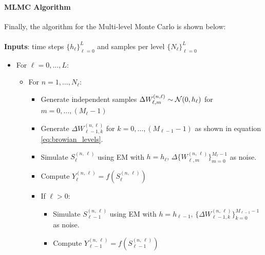 \paragraph{MLMC Algorithm}
Finally, the algorithm for the Multi-level Monte Carlo is shown below:
\\
\\
\textbf{Inputs}: time steps $\{h_\ell\}_{\ell=0}^L$ and samples per level $\{N_\ell\}_{\ell=0}^L$
\begin{itemize}
    \item For \begin{math}\ell = 0 , ... , L\end{math}:
    \begin{itemize}

        \item For $n = 1, \dots , N_\ell$:

        \begin{itemize}
        
        \item Generate independent samples $\Delta W_{\ell,m}^{(n,\ell)} \sim \mathcal{N}(0, h_\ell)$ for $m = 0,\dots,(M_\ell -1)$
        \item Generate $\Delta W_{\ell-1,k}^{(n,\ell)}$ for $k = 0,\dots,(M_{\ell-1}-1)$ as shown in equation \ref{eq:browian_levels}.
        
        \item Simulate \begin{math}S_{\ell}^{(n,\,\ell)}\end{math} using EM with \begin{math}
            h = h_{\ell} ,\, \Delta \{W_{\ell,m}^{(n,\,\ell)}\}_{m=0}^{M_\ell-1}\end{math} as noise.
        \item Compute \begin{math}
                Y_{\ell}^{(n,\,\ell)} = f(S_{\ell}^{(n,\,\ell)})
            \end{math}


        \item If \begin{math}
            \ell > 0 
        \end{math}:

        \begin{itemize}
            \item Simulate \begin{math}S_{\ell-1}^{(n,\,\ell)}\end{math} using EM with \begin{math}
            h = h_{\ell-1} ,\, \{ \Delta W_{\ell-1,k}^{(n,\,\ell)} \}_{k=0}^{M_{\ell-1}-1} \end{math} as noise.
            \item Compute \begin{math}
                    Y_{\ell-1}^{(n,\,\ell)} = f(S_{\ell-1}^{(n,\,\ell)})
                \end{math}
            

\end{itemize}
\end{itemize}
\end{itemize}
\end{itemize}
